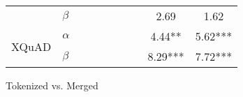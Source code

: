 {{\begin{tabular}{llcc|cc|cc|cc}
    \multicolumn{1}{c}{}                         & $\beta$   & \multicolumn{1}{c|}{\cellcolor{llight-gray}}    & \multicolumn{1}{c|}{\cellcolor{llight-gray}}   & \multicolumn{1}{c|}{\cellcolor{llight-gray}}      & \multicolumn{1}{c|}{\cellcolor{llight-gray}}   & \multicolumn{1}{c|}{\cellcolor{llight-gray}}  & \multicolumn{1}{c|}{\cellcolor{llight-gray}}   & \multicolumn{1}{c|}{\cellcolor{yellow} 2.69}     & \multicolumn{1}{c}{\cellcolor{yellow} 1.62}     \\ \cline{3-10}
    \multicolumn{1}{c}{\multirow{2}{*}{XQuAD}}   & $\alpha$  & \multicolumn{1}{c|}{\cellcolor{llight-gray}}    & \multicolumn{1}{c|}{\cellcolor{llight-gray}}   & \multicolumn{1}{c|}{\cellcolor{llight-gray}}      & \multicolumn{1}{c|}{\cellcolor{llight-gray}}   & \multicolumn{1}{c|}{\cellcolor{llight-gray}}  & \multicolumn{1}{c|}{\cellcolor{llight-gray}}   & \multicolumn{1}{c|}{\cellcolor{yellow} 4.44**}   & \multicolumn{1}{c}{\cellcolor{yellow} 5.62***}  \\
    \multicolumn{1}{c}{}                         & $\beta$   & \multicolumn{1}{c|}{\cellcolor{llight-gray}}    & \multicolumn{1}{c|}{\cellcolor{llight-gray}}   & \multicolumn{1}{c|}{\cellcolor{llight-gray}}      & \multicolumn{1}{c|}{\cellcolor{llight-gray}}   & \multicolumn{1}{c|}{\cellcolor{llight-gray}}  & \multicolumn{1}{c|}{\cellcolor{llight-gray}}   & \multicolumn{1}{c|}{\cellcolor{yellow} 8.29***}  & \multicolumn{1}{c}{\cellcolor{yellow} 7.72***}  \\
    \end{tabular}
  }
}{Tokenized vs. Merged}

